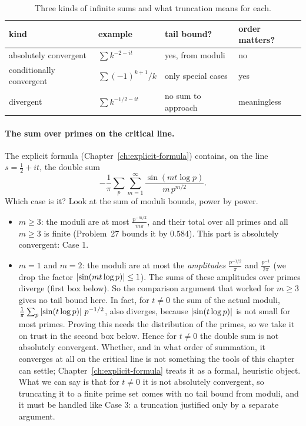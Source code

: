 \begin{table}[htbp]\centering
\caption{Three kinds of infinite sums and what truncation means for each.}
\label{tab:series-truncation}
\begin{tabular}{llll}
\toprule
kind & example & tail bound? & order matters?\\
\midrule
absolutely convergent & $\sum k^{-2-it}$ & yes, from moduli & no\\
conditionally convergent & $\sum(-1)^{k+1}/k$ & only special cases & yes\\
divergent & $\sum k^{-1/2-it}$ & no sum to approach & meaningless\\
\bottomrule
\end{tabular}
\end{table}

\paragraph{The sum over primes on the critical line.} The explicit formula (Chapter~\ref{ch:explicit-formula}) contains, on the line $s=\tfrac12+it$, the double sum
\[
-\frac1\pi\sum_p\sum_{m=1}^\infty\frac{\sin(mt\log p)}{m\,p^{m/2}} .
\]
Which case is it? Look at the sum of moduli bounds, power by power.
\begin{itemize}
\item $m\ge3$: the moduli are at most $\frac{p^{-m/2}}{m\pi}$, and their total over all primes and all $m\ge3$ is finite (Problem~27 bounds it by $0.584$). This part is absolutely convergent: Case 1.
\item $m=1$ and $m=2$: the moduli are at most the \emph{amplitudes} $\frac{p^{-1/2}}{\pi}$ and $\frac{p^{-1}}{2\pi}$ (we drop the factor $\left\lvert \sin(mt\log p)\right\rvert\le1$). The sums of these amplitudes over primes diverge (first box below). So the comparison argument that worked for $m\ge3$ gives no tail bound here. In fact, for $t\ne0$ the sum of the actual moduli, $\frac1\pi\sum_p\left\lvert \sin(t\log p)\right\rvert\,p^{-1/2}$, also diverges, because $\left\lvert \sin(t\log p)\right\rvert$ is not small for most primes. Proving this needs the distribution of the primes, so we take it on trust in the second box below. Hence for $t\ne0$ the double sum is not absolutely convergent. Whether, and in what order of summation, it converges at all on the critical line is not something the tools of this chapter can settle; Chapter~\ref{ch:explicit-formula} treats it as a formal, heuristic object. What we can say is that for $t\ne0$ it is not absolutely convergent, so truncating it to a finite prime set comes with no tail bound from moduli, and it must be handled like Case 3: a truncation justified only by a separate argument.
\end{itemize}


